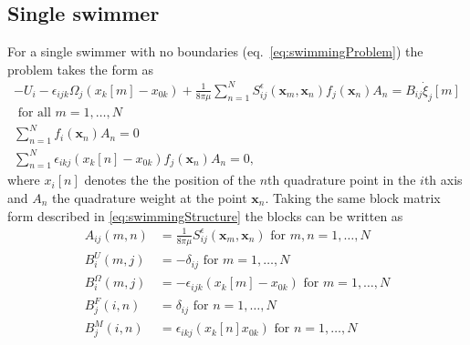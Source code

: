 \subsection{Single swimmer}
For a single swimmer with no boundaries (eq.~\ref{eq:swimmingProblem}) the problem takes the form as 
\begin{equation*}
\begin{gathered}
    -U_{i}-\epsilon_{i j k} \Omega_{j}\left(x_k[{m}]-x_{0 k}\right)+\frac{1}{8 \pi\mu} \sum_{n=1}^N S_{i j}^{\epsilon}(\bm{x}_m, \bm{x}_n) f_{j}(\bm{x}_n) A_n =  B_{i j} \dot{\xi}_{j}[m] \\ \text { for all } m = 1,\dots,N\\
    \sum_{n=1}^N f_{i}(\bm{x}_n) A_n=0 \\
    \sum_{n=1}^N \epsilon_{i k j} (x_{k}[n]-x_{0 k}) f_{j}(\bm{x}_n) A_n=0,
\end{gathered}
\end{equation*}
where $x_{i}[n]$ denotes the the position of the $n$th quadrature point in the $i$th axis and $A_n$ the quadrature weight at the point $\bm{x}_n$. Taking the same block matrix form described in \cref{eq:swimmingStructure} the blocks can be written as
\begin{align*}
A_{ij}(m,n) &= \frac{1}{8\pi\mu} S_{ij}^\epsilon (\bm{x}_m,\bm{x}_{n}) \text { for } m,n = 1,\dots,N \\
B_{i}^{U}(m,j) &= -\delta_{ij} \text { for } m = 1,\dots,N \\
B_{i}^{\Omega}(m,j) &= -\epsilon_{ijk}(x_k[m]-x_{0k}) \text { for } m = 1,\dots,N \\
B_{j}^{F}(i,n) &= \delta_{ij} \text { for } n = 1,\dots,N \\
B_{j}^{M}(i,n) &= \epsilon_{ikj} (x_k[n]x_{0 k}) \text { for } n = 1,\dots,N
\end{align*}

